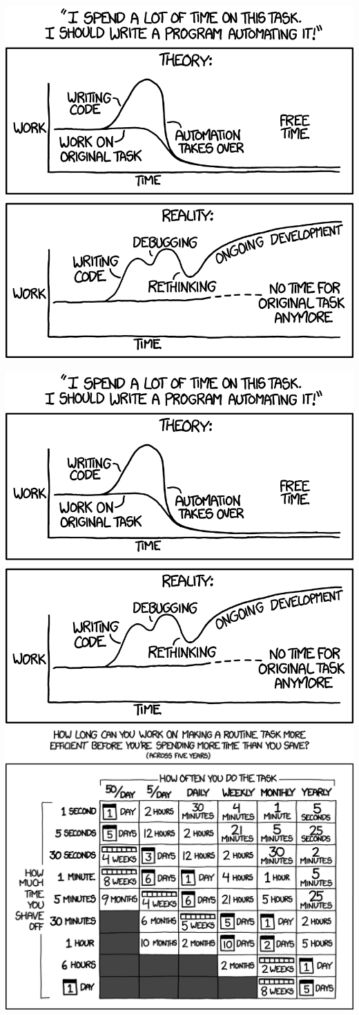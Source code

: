\documentclass{beamer}
\begin{document}
\begin{frame}[plain]
    \begin{minipage}{\textwidth}
        \centering
        \includegraphics[width=0.7\linewidth]{automation_2x.png}
    \end{minipage}
\end{frame}

\begin{frame}[plain]
    \begin{minipage}{\textwidth}
        \centering
        \includegraphics[width=0.4\linewidth]{automation_2x.png}
        \includegraphics[width=0.5\linewidth]{is_it_worth_the_time_2x.png}
    \end{minipage}
\end{frame}
\end{document}
